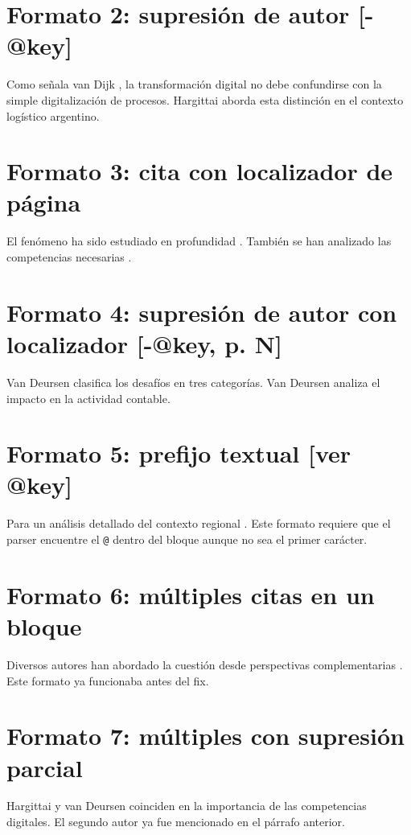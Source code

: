 \section{Formato 2: supresión de autor [-@key]}
Como señala van Dijk \autocite{2563-VANDIJK2020}, la transformación digital no debe confundirse con la simple digitalización de procesos. Hargittai \autocite{2565-HARGITTAI2002} aborda esta distinción en el contexto logístico argentino.


\section{Formato 3: cita con localizador de página}
El fenómeno ha sido estudiado en profundidad \autocite{2564-VANDEURSEN2019}. También se han analizado las competencias necesarias \autocite{2564-VANDEURSEN2019}.


\section{Formato 4: supresión de autor con localizador [-@key, p. N]}
Van Deursen \autocite{2564-VANDEURSEN2019} clasifica los desafíos en tres categorías. Van Deursen \autocite{2564-VANDEURSEN2019} analiza el impacto en la actividad contable.


\section{Formato 5: prefijo textual [ver @key]}
Para un análisis detallado del contexto regional \autocite{2566-CEPAL2021}. Este formato requiere que el parser encuentre el \texttt{@} dentro del bloque aunque no sea el primer carácter.


\section{Formato 6: múltiples citas en un bloque}
Diversos autores han abordado la cuestión desde perspectivas complementarias \autocite{2565-HARGITTAI2002,2562-WARSCHAUER2004}. Este formato ya funcionaba antes del fix.


\section{Formato 7: múltiples con supresión parcial}
Hargittai y van Deursen \autocite{2565-HARGITTAI2002,2564-VANDEURSEN2019} coinciden en la importancia de las competencias digitales. El segundo autor ya fue mencionado en el párrafo anterior.


